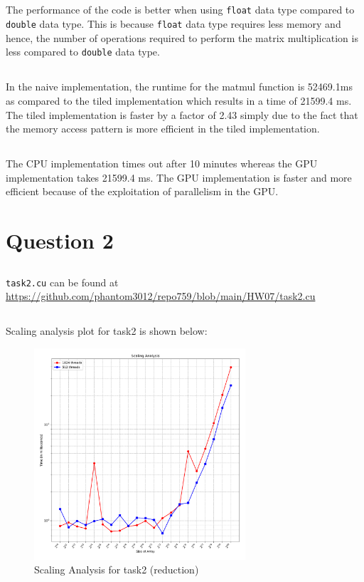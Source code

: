 \documentclass[12pt]{article}
\begin{document}
\subsection{} %
The performance of the code is better when using \texttt{float} data type compared to \texttt{double} data type. This is because \texttt{float} data type requires less memory and hence, the number of operations required to perform the matrix multiplication is less compared to \texttt{double} data type.
\subsection{} %
In the naive implementation, the runtime for the matmul function is 52469.1ms as compared to the tiled implementation which results in a time of 21599.4 ms. The tiled implementation is faster by a factor of 2.43 simply due to the fact that the memory access pattern is more efficient in the tiled implementation.
\subsection{} %
The CPU implementation times out after 10 minutes whereas the GPU implementation takes 21599.4 ms. The GPU implementation is faster and more efficient because of the exploitation of parallelism in the GPU.


\clearpage
\section{Question 2}

\subsection{}
\texttt{task2.cu} can be found at \url{https://github.com/phantom3012/repo759/blob/main/HW07/task2.cu}

\subsection{}
Scaling analysis plot for task2 is shown below:
\begin{figure}[ht]
    \centering
    \includegraphics[width=0.7\textwidth]{task2.pdf}
    \caption{Scaling Analysis for task2 (reduction)}
\end{figure}
\end{document}
